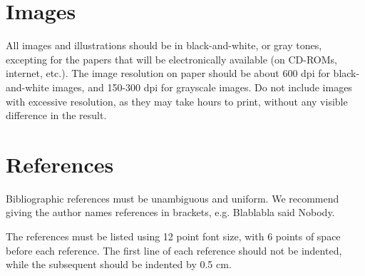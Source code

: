 \documentclass[12pt]{article}
\begin{document}
\section{Images}

All images and illustrations should be in black-and-white, or gray tones,
excepting for the papers that will be electronically available (on CD-ROMs,
internet, etc.). The image resolution on paper should be about 600 dpi for
black-and-white images, and 150-300 dpi for grayscale images.  Do not include
images with excessive resolution, as they may take hours to print, without any
visible difference in the result. 

\section{References}

Bibliographic references must be unambiguous and uniform.  We recommend giving
the author names references in brackets, e.g. Blablabla said Nobody.

The references must be listed using 12 point font size, with 6 points of space
before each reference. The first line of each reference should not be
indented, while the subsequent should be indented by 0.5 cm.



\end{document}

